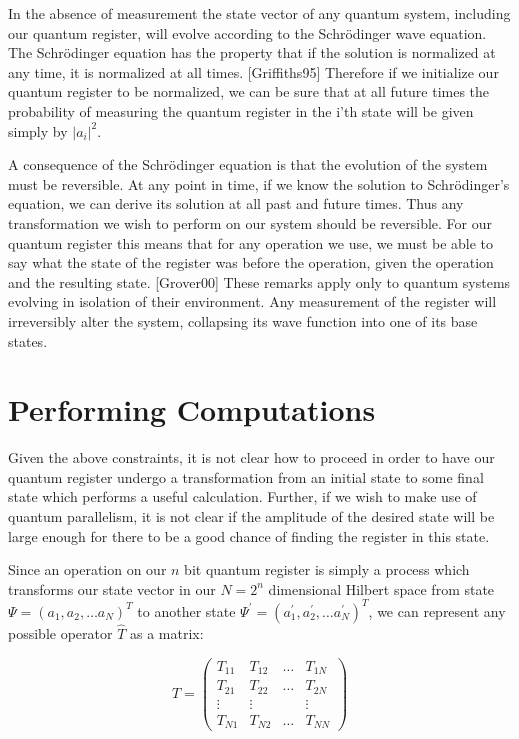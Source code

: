 \documentclass[]{article}
\begin{document}
In the absence of measurement the state vector of any quantum system,
including our quantum register, will evolve according to the
Schr\"{o}dinger wave equation.  The Schr\"{o}dinger equation has the
property that if the solution is normalized at any time, it is
normalized at all times. [Griffiths95] Therefore if we initialize our
quantum register to be normalized, we can be sure that at all future
times the probability of measuring the quantum register in the i'th
state will be given simply by $|a_{i}|^{2}$.

A consequence of the Schr\"{o}dinger equation is that the evolution of
the system must be reversible.  At any point in time, if we know the
solution to Schr\"{o}dinger's equation, we can derive its solution at
all past and future times.  Thus any transformation we wish to perform
on our system should be reversible.  For our quantum register this
means that for any operation we use, we must be able to say what the
state of the register was before the operation, given the operation
and the resulting state. [Grover00] These remarks apply only to
quantum systems evolving in isolation of their environment.  Any
measurement of the register will irreversibly alter the system,
collapsing its wave function into one of its base states.

\section{Performing Computations}

Given the above constraints, it is not clear how to proceed in order
to have our quantum register undergo a transformation from an initial
state to some final state which performs a useful calculation.
Further, if we wish to make use of quantum parallelism, it is not
clear if the amplitude of the desired state will be large enough for
there to be a good chance of finding the register in this state.

Since an operation on our $n$ bit quantum register is simply a process
which transforms our state vector in our $N = 2^{n}$ dimensional
Hilbert space from state $\Psi = (a_{1}, a_{2}, \ldots a_{N})^{T}$ to
another state $\Psi^{'} = (a_{1}^{'}, a_{2}^{'}, \ldots
a_{N}^{'})^{T}$, we can represent any possible operator $\hat{T}$ as a
matrix:
	
	\[T = \left( \begin{array}{cccc}
	T_{11} & T_{12} & \ldots & T_{1N} \\
	T_{21} & T_{22} & \ldots & T_{2N} \\	
	\vdots & \vdots &        & \vdots \\
	T_{N1} & T_{N2} & \ldots & T_{NN} 
	\end{array}
	\right)
	\]
\end{document}
